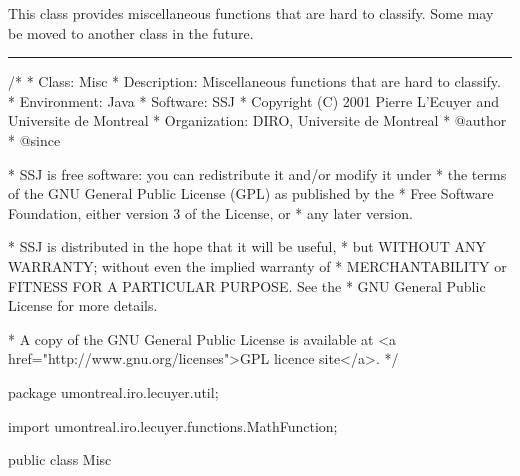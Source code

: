 
This class provides miscellaneous functions that are hard to classify.
Some may be moved to another class in the future.

\bigskip\hrule

\begin{code}\begin{hide}
/*
 * Class:        Misc
 * Description:  Miscellaneous functions that are hard to classify.
 * Environment:  Java
 * Software:     SSJ
 * Copyright (C) 2001  Pierre L'Ecuyer and Universite de Montreal
 * Organization: DIRO, Universite de Montreal
 * @author
 * @since

 * SSJ is free software: you can redistribute it and/or modify it under
 * the terms of the GNU General Public License (GPL) as published by the
 * Free Software Foundation, either version 3 of the License, or
 * any later version.

 * SSJ is distributed in the hope that it will be useful,
 * but WITHOUT ANY WARRANTY; without even the implied warranty of
 * MERCHANTABILITY or FITNESS FOR A PARTICULAR PURPOSE.  See the
 * GNU General Public License for more details.

 * A copy of the GNU General Public License is available at
   <a href="http://www.gnu.org/licenses">GPL licence site</a>.
 */
\end{hide}
package umontreal.iro.lecuyer.util;\begin{hide}
   import umontreal.iro.lecuyer.functions.MathFunction;\end{hide}

public class Misc\begin{hide} {
   private Misc() {}\end{hide}
\end{code}

